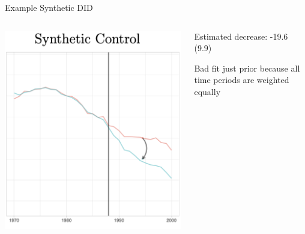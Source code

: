 \documentclass[t]{beamer}
\begin{document}
\begin{frame}{Example Synthetic DID}
  \begin{columns}[T]
    \begin{column}{.65\textwidth}
      \includegraphics[width=\textwidth]{lecture_includes/sdid_1.png}
    \end{column}
    \hfill
    \begin{column}{.3\textwidth}
      Estimated decrease: -19.6 (9.9)
      
      \bigskip Bad fit just prior because all time periods are weighted equally
    \end{column}
  \end{columns}
\end{frame}
\end{document}
